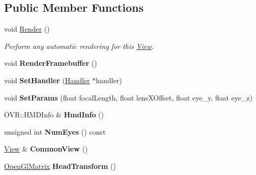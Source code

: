 \subsection*{Public Member Functions}
\begin{DoxyCompactItemize}
\item 
void \hyperlink{classpangolin_1_1_oculus_hud_a54d2f4e6a2e7919a7808de679d490197}{Render} ()
\begin{DoxyCompactList}\small\item\em Perform any automatic rendering for this \hyperlink{structpangolin_1_1_view}{View}. \end{DoxyCompactList}\item 
void {\bfseries Render\+Framebuffer} ()\hypertarget{classpangolin_1_1_oculus_hud_accfc28351dfcec0b0feeba79567fc13a}{}\label{classpangolin_1_1_oculus_hud_accfc28351dfcec0b0feeba79567fc13a}

\item 
void {\bfseries Set\+Handler} (\hyperlink{structpangolin_1_1_handler}{Handler} $\ast$handler)\hypertarget{classpangolin_1_1_oculus_hud_a7c9add08ddbcfc7e6f2b6039397f1822}{}\label{classpangolin_1_1_oculus_hud_a7c9add08ddbcfc7e6f2b6039397f1822}

\item 
void {\bfseries Set\+Params} (float focal\+Length, float lens\+X\+Offset, float eye\+\_\+y, float eye\+\_\+z)\hypertarget{classpangolin_1_1_oculus_hud_afc6aa548d662ce07b3f695061d103eee}{}\label{classpangolin_1_1_oculus_hud_afc6aa548d662ce07b3f695061d103eee}

\item 
O\+V\+R\+::\+H\+M\+D\+Info \& {\bfseries Hmd\+Info} ()\hypertarget{classpangolin_1_1_oculus_hud_a4e21b86c96587ccdbceb1b17d7f428cb}{}\label{classpangolin_1_1_oculus_hud_a4e21b86c96587ccdbceb1b17d7f428cb}

\item 
unsigned int {\bfseries Num\+Eyes} () const \hypertarget{classpangolin_1_1_oculus_hud_ac0913f2f49cf75b5cbb656eaf663520f}{}\label{classpangolin_1_1_oculus_hud_ac0913f2f49cf75b5cbb656eaf663520f}

\item 
\hyperlink{structpangolin_1_1_view}{View} \& {\bfseries Common\+View} ()\hypertarget{classpangolin_1_1_oculus_hud_a916b141f2da3690d03908e1e4be6d537}{}\label{classpangolin_1_1_oculus_hud_a916b141f2da3690d03908e1e4be6d537}

\item 
\hyperlink{structpangolin_1_1_open_gl_matrix}{Open\+Gl\+Matrix} {\bfseries Head\+Transform} ()\hypertarget{classpangolin_1_1_oculus_hud_aee116324d9d14f1562889870aaff77e4}{}\label{classpangolin_1_1_oculus_hud_aee116324d9d14f1562889870aaff77e4}


\end{DoxyCompactItemize}
